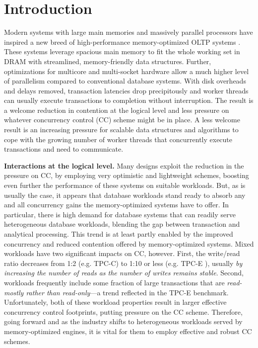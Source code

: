 
\section{Introduction}

Modern systems with large main memories and massively parallel processors have inspired a new breed of high-performance memory-optimized OLTP systems \cite{Kallman+08,PandisJHA10,KemperN11,LarsonBDFPZ11,TuZKLM13}. These systems leverage spacious main memory to fit the whole working set in DRAM with streamlined, memory-friendly data structures. Further, optimizations for multicore and multi-socket hardware allow a much higher level of parallelism compared to conventional database systems. With disk overheads and delays removed, transaction latencies drop precipitously and worker threads can usually execute transactions to completion without interruption. The result is a welcome reduction in contention at the logical level and less pressure on whatever concurrency control (CC) scheme might be in place. A less welcome result is an increasing pressure for scalable data structures and algorithms to cope with the growing number of worker threads that concurrently execute transactions and need to communicate.


\vspace{2mm}
{\bf Interactions at the logical level.} 
Many designs exploit the reduction in the pressure on CC, by employing very optimistic and lightweight schemes, boosting even further the performance of these systems on suitable workloads.
But, as is usually the case, it appears that database workloads stand ready to absorb any and all concurrency gains the memory-optimized systems have to offer. In particular, there is high demand for database systems that can readily serve heterogeneous database workloads, blending the gap between transaction and analytical processing. This trend is at least partly enabled by the improved concurrency and reduced contention offered by memory-optimized systems. Mixed workloads have two significant impacts on CC, however. First, the write/read ratio decreases from 1:2 (e.g. TPC-C) to 1:10 or less (e.g. TPC-E \cite{TozunPKJA13}), usually {\it by increasing the number of reads as the number of writes remains stable}. 
Second, workloads frequently include some fraction of large transactions that are {\it read-mostly rather than read-only}---a trend reflected in the TPC-E benchmark. Unfortunately, both of these workload properties result in larger effective concurrency control footprints, putting pressure on the CC scheme. 
Therefore, going forward and as the industry shifts to heterogeneous workloads served by memory-optimized engines, it is vital for them to employ effective and robust CC schemes. 


